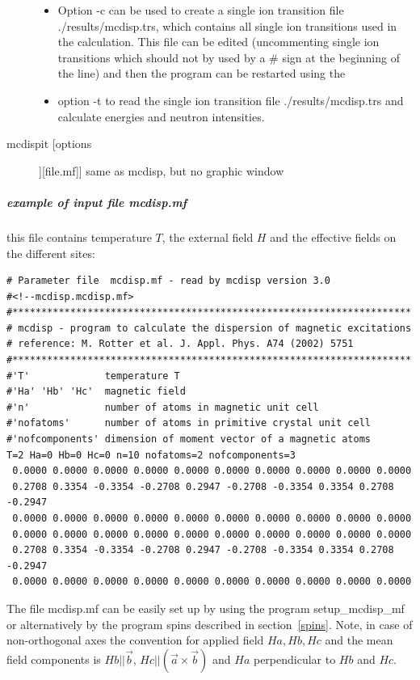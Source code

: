 \begin{description}
\begin{itemize}
				\item Option {\prg -c}  can be used to create  a single ion
				transition file {\prg ./results/mcdisp.trs}, which contains
				all single ion transitions used in the calculation. This file can
				be edited (uncommenting single ion transitions which should not
				by used by a \# sign at the beginning of the line)
				and then the program can be restarted using the 
				\item  option {\prg -t} to
				read the single ion transition file {\prg ./results/mcdisp.trs} and
				calculate energies and neutron intensities.
				\end{itemize}
\item [\prg mcdispit [options]][file.mf]]  same as {\prg mcdisp}, but no graphic window
\end{description} 

\subparagraph{example of input file {\prg  mcdisp.mf}}
this file contains temperature $T$, the external field $H$ and
the effective fields on the different sites:

\begin{verbatim}
# Parameter file  mcdisp.mf - read by mcdisp version 3.0
#<!--mcdisp.mcdisp.mf>
#*********************************************************************
# mcdisp - program to calculate the dispersion of magnetic excitations
# reference: M. Rotter et al. J. Appl. Phys. A74 (2002) 5751
#*********************************************************************
#'T'             temperature T
#'Ha' 'Hb' 'Hc'  magnetic field
#'n'             number of atoms in magnetic unit cell
#'nofatoms'      number of atoms in primitive crystal unit cell
#'nofcomponents' dimension of moment vector of a magnetic atoms
T=2 Ha=0 Hb=0 Hc=0 n=10 nofatoms=2 nofcomponents=3
 0.0000 0.0000 0.0000 0.0000 0.0000 0.0000 0.0000 0.0000 0.0000 0.0000
 0.2708 0.3354 -0.3354 -0.2708 0.2947 -0.2708 -0.3354 0.3354 0.2708 -0.2947
 0.0000 0.0000 0.0000 0.0000 0.0000 0.0000 0.0000 0.0000 0.0000 0.0000
 0.0000 0.0000 0.0000 0.0000 0.0000 0.0000 0.0000 0.0000 0.0000 0.0000
 0.2708 0.3354 -0.3354 -0.2708 0.2947 -0.2708 -0.3354 0.3354 0.2708 -0.2947
 0.0000 0.0000 0.0000 0.0000 0.0000 0.0000 0.0000 0.0000 0.0000 0.0000
\end{verbatim}

The file {\prg mcdisp.mf} can be easily set up by using the program {\prg %
setup\_mcdisp\_mf} or alternatively by the program {\prg spins} 
described in section~\ref{spins}.
                            Note, in case of non-orthogonal axes the convention for applied field $Ha, Hb,Hc$ and
                            the mean field components
                            is $Hb||\vec b$, $Hc||(\vec a \times \vec b)$ and $Ha$ perpendicular to $Hb$ and $Hc$.

